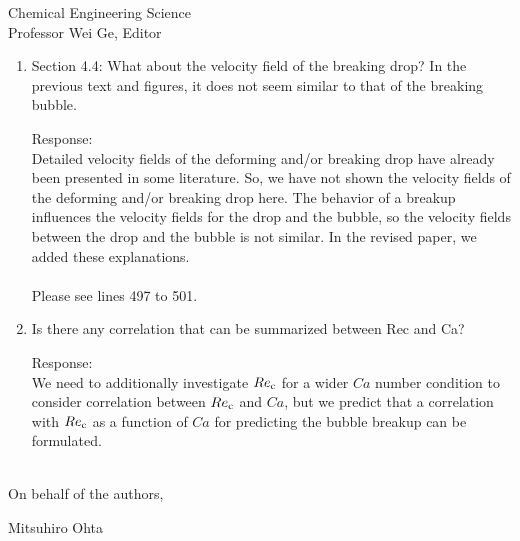 \documentclass{letter}
\begin{document}
\begin{letter}{
Chemical Engineering Science\\
Professor Wei Ge, Editor\\}
\begin{enumerate}
\par\noindent
\item
\textsf
{Section 4.4: What about the velocity field of the breaking drop? In the previous text and figures, it does not seem similar to that of the breaking bubble.}
\vspace{3 mm}

Response: \\
Detailed velocity fields of the deforming and/or breaking drop have already been presented in some literature.
So, we have not shown the velocity fields of the deforming and/or breaking drop here.
The behavior of a breakup influences the velocity fields for the drop and the bubble, so the velocity fields between the drop 
and the bubble is not similar.
In the revised paper, we added these explanations.  \\
\\
Please see lines 497 to 501.
\\


\par\noindent
\item
\textsf
{Is there any correlation that can be summarized between Rec and Ca?}
\vspace{3 mm}

Response: \\
We need to additionally investigate $Re_{\rm c}$ for a wider $Ca$ number condition to consider correlation between $Re_{\rm c}$ and $Ca$,
but we predict that a correlation with $Re_{\rm c}$ as a function of $Ca$ for predicting the bubble breakup can be formulated.\\
\\


\end{enumerate}

\closing{On behalf of the authors,}
Mitsuhiro Ohta

\end{letter}
\end{document}
